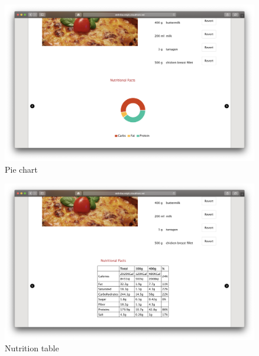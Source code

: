 \vspace{-2em}
\begin{figure}[H]
	\captionsetup{justification=centering}
	\begin{center}
		\includegraphics[scale=0.25]{Ressourcen/img/screenshots/screenshotL.png}
		\vspace{-3em}
		\caption{Pie chart}
	\end{center}
\end{figure}

\vspace{-2em}
\begin{figure}[H]
	\captionsetup{justification=centering}
	\begin{center}
		\includegraphics[scale=0.25]{Ressourcen/img/screenshots/screenshotM.png}
		\vspace{-3em}
		\caption{Nutrition table}
	\end{center}
\end{figure}

